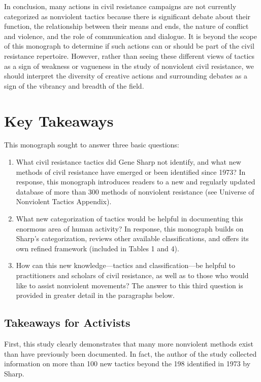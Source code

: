 \documentclass[twoside,a4paper,12pt,fleqn,openany]{extbook}
\begin{document}
In conclusion, many actions in civil resistance campaigns are not currently categorized as nonviolent tactics because there is significant debate about their function, the relationship between their means and ends, the nature of conflict and violence, and the role of communication and dialogue. It is beyond the scope of this monograph to determine if such actions can or should be part of the civil resistance repertoire. However, rather than seeing these different views of tactics as a sign of weakness or vagueness in the study of nonviolent civil resistance, we should interpret the diversity of creative actions and surrounding debates as a sign of the vibrancy and breadth of the field.

\chapter{Key Takeaways}

This monograph sought to answer three basic questions:

\begin{enumerate}
\item What civil resistance tactics did Gene Sharp not identify, and what new methods of civil resistance have emerged or been identified since 1973? In response, this monograph introduces readers to a new and regularly updated database of more than 300 methods of nonviolent resistance (see Universe of Nonviolent Tactics Appendix).
\item What new categorization of tactics would be helpful in documenting this enormous area of human activity? In response, this monograph builds on Sharp’s categorization, reviews other available classifications, and offers its own refined framework (included in Tables 1 and 4).
\item How can this new knowledge—tactics and classification—be helpful to practitioners and scholars of civil resistance, as well as to those who would like to assist nonviolent movements? The answer to this third question is provided in greater detail in the paragraphs below.
\end{enumerate}

\section*{Takeaways for Activists}

First, this study clearly demonstrates that many more nonviolent methods exist than have previously been documented. In fact, the author of the study collected information on more than 100 new tactics beyond the 198 identified in 1973 by Sharp.
\end{document}

